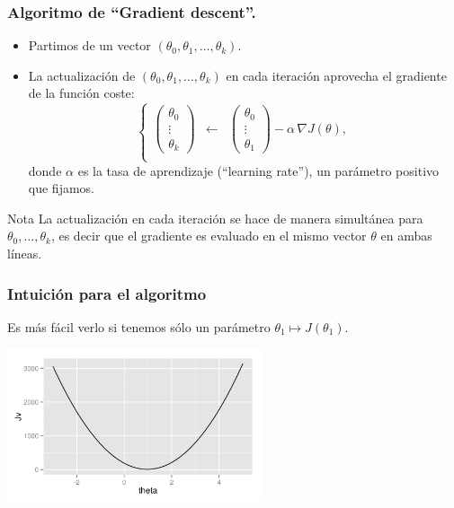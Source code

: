 \documentclass[aspectratio=169]{beamer}
\begin{document}
\begin{frame}
\frametitle{Algoritmo de ``Gradient descent''.}
\begin{itemize}
\item Partimos de un vector $(\theta_0,\theta_1,\ldots,\theta_k)$.
\item<+-> La actualización de $(\theta_0,\theta_1,\ldots,\theta_k)$ en cada iteración aprovecha el gradiente de la función coste:
$$\left\{\begin{array}{lcl}
           \left(\begin{array}{c}\theta_0\\
                   \vdots\\
  \theta_k
\end{array}
           \right)&\leftarrow& \left(\begin{array}{c}\theta_0\\
                                       \vdots\\
\theta_1
\end{array}
\right)-\alpha\,\nabla J(\theta),\\
\end{array}\right.$$
donde $\alpha$ es la tasa de aprendizaje (``learning rate''), un parámetro positivo que fijamos.
\end{itemize}
\begin{block}{Nota}
{\scriptsize La actualización en cada iteración se hace de manera
  simultánea para $\theta_0, \ldots,\theta_k$, es decir que el gradiente es evaluado en el mismo vector $\theta$ en ambas líneas.} 
  
\end{block}
\end{frame}
\begin{frame}
 \frametitle{Intuición para el algoritmo}
 \begin{overlayarea}{\textwidth}{8cm}
 Es más fácil verlo si tenemos sólo un parámetro $\theta_1\mapsto J(\theta_1)$.
\begin{center}
  \includegraphics[height=4.5cm]{funcionccosterectaorigen.png}
\end{center}
 \end{overlayarea}
\end{frame}
\end{document}
